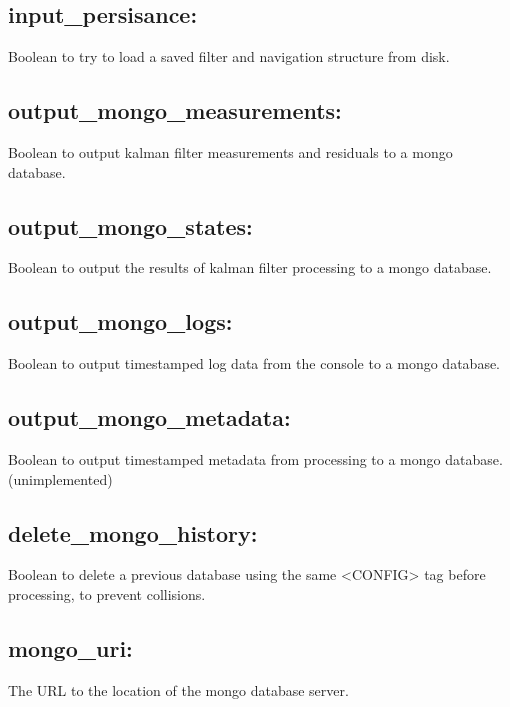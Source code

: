 \subsection*{input\_persisance:}
Boolean to try to load a saved filter and navigation structure from disk.

\subsection*{output\_mongo\_measurements:}
Boolean to output kalman filter measurements and residuals to a mongo database.

\subsection*{output\_mongo\_states:}
Boolean to output the results of kalman filter processing to a mongo database.

\subsection*{output\_mongo\_logs:}
Boolean to output timestamped log data from the console to a mongo database.

\subsection*{output\_mongo\_metadata:}
Boolean to output timestamped metadata from processing to a mongo database. (unimplemented)

\subsection*{delete\_mongo\_history:}
Boolean to delete a previous database using the same <CONFIG> tag before processing, to prevent collisions.

\subsection*{mongo\_uri:}
The URL to the location of the mongo database server.



















